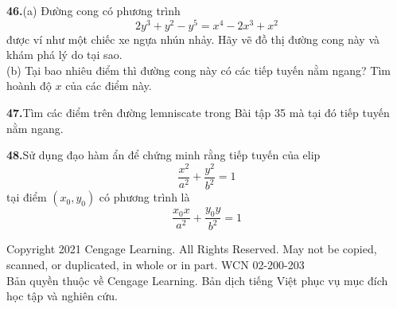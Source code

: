\begin{minipage}[t]{0.48\textwidth}
  \noindent
  \makebox[0pt][r]{\graphicon\enspace}\textbf{46.}\enspace (a) Đường cong có phương trình
  \[ 2y^3 + y^2 - y^5 = x^4 - 2x^3 + x^2 \]
  được ví như một chiếc xe ngựa nhún nhảy. Hãy vẽ đồ thị đường cong này và khám phá lý do tại sao.\\[0.3em]
  (b) Tại bao nhiêu điểm thì đường cong này có các tiếp tuyến nằm ngang? Tìm hoành độ $x$ của các điểm này.
  \vspace{0.45em}

  \noindent
  \textbf{47.}\enspace Tìm các điểm trên đường lemniscate trong Bài tập 35 mà tại đó tiếp tuyến nằm ngang.
  \vspace{0.45em}

  \noindent
  \textbf{48.}\enspace Sử dụng đạo hàm ẩn để chứng minh rằng tiếp tuyến của elip
  \[ \frac{x^2}{a^2} + \frac{y^2}{b^2} = 1 \]
  tại điểm $(x_0, y_0)$ có phương trình là
  \[ \frac{x_0x}{a^2} + \frac{y_0y}{b^2} = 1 \]
\end{minipage}

\vfill
\begin{center}
  \fontsize{6.5pt}{8pt}\selectfont\color{gray!80}
  Copyright 2021 Cengage Learning. All Rights Reserved. May not be copied, scanned, or duplicated, in whole or in part. WCN 02-200-203\\
  Bản quyền thuộc về Cengage Learning. Bản dịch tiếng Việt phục vụ mục đích học tập và nghiên cứu.
\end{center}
